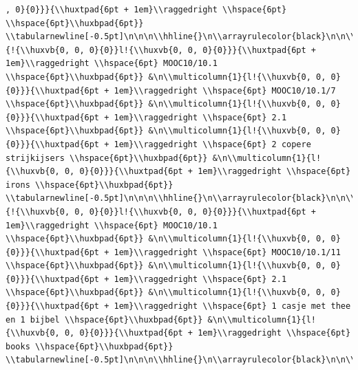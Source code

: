 \documentclass[11pt,preprint, authoryear]{elsarticle}
\numberwithin{equation}{section}
\numberwithin{figure}{section}
\numberwithin{table}{section}
\begin{document}
\begin{verbatim}
, 0}{0}}}{\\huxtpad{6pt + 1em}\\raggedright \\hspace{6pt}  \\hspace{6pt}\\huxbpad{6pt}} \\tabularnewline[-0.5pt]\n\n\n\\hhline{}\n\\arrayrulecolor{black}\n\n\\multicolumn{1}{!{\\huxvb{0, 0, 0}{0}}l!{\\huxvb{0, 0, 0}{0}}}{\\huxtpad{6pt + 1em}\\raggedright \\hspace{6pt} MOOC10/10.1 \\hspace{6pt}\\huxbpad{6pt}} &\n\\multicolumn{1}{l!{\\huxvb{0, 0, 0}{0}}}{\\huxtpad{6pt + 1em}\\raggedright \\hspace{6pt} MOOC10/10.1/7 \\hspace{6pt}\\huxbpad{6pt}} &\n\\multicolumn{1}{l!{\\huxvb{0, 0, 0}{0}}}{\\huxtpad{6pt + 1em}\\raggedright \\hspace{6pt} 2.1 \\hspace{6pt}\\huxbpad{6pt}} &\n\\multicolumn{1}{l!{\\huxvb{0, 0, 0}{0}}}{\\huxtpad{6pt + 1em}\\raggedright \\hspace{6pt} 2 copere strijkijsers \\hspace{6pt}\\huxbpad{6pt}} &\n\\multicolumn{1}{l!{\\huxvb{0, 0, 0}{0}}}{\\huxtpad{6pt + 1em}\\raggedright \\hspace{6pt} irons \\hspace{6pt}\\huxbpad{6pt}} \\tabularnewline[-0.5pt]\n\n\n\\hhline{}\n\\arrayrulecolor{black}\n\n\\multicolumn{1}{!{\\huxvb{0, 0, 0}{0}}l!{\\huxvb{0, 0, 0}{0}}}{\\huxtpad{6pt + 1em}\\raggedright \\hspace{6pt} MOOC10/10.1 \\hspace{6pt}\\huxbpad{6pt}} &\n\\multicolumn{1}{l!{\\huxvb{0, 0, 0}{0}}}{\\huxtpad{6pt + 1em}\\raggedright \\hspace{6pt} MOOC10/10.1/11 \\hspace{6pt}\\huxbpad{6pt}} &\n\\multicolumn{1}{l!{\\huxvb{0, 0, 0}{0}}}{\\huxtpad{6pt + 1em}\\raggedright \\hspace{6pt} 2.1 \\hspace{6pt}\\huxbpad{6pt}} &\n\\multicolumn{1}{l!{\\huxvb{0, 0, 0}{0}}}{\\huxtpad{6pt + 1em}\\raggedright \\hspace{6pt} 1 casje met thee en 1 bijbel \\hspace{6pt}\\huxbpad{6pt}} &\n\\multicolumn{1}{l!{\\huxvb{0, 0, 0}{0}}}{\\huxtpad{6pt + 1em}\\raggedright \\hspace{6pt} books \\hspace{6pt}\\huxbpad{6pt}} \\tabularnewline[-0.5pt]\n\n\n\\hhline{}\n\\arrayrulecolor{black}\n\n\\multicolumn{
\end{verbatim}
\end{document}
